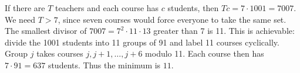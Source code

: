 If there are $ T $ teachers and each course has $ c $ students, then $ Tc=7\cdot1001=7007 $. We need $ T>7 $, since seven courses would force everyone to take the same set. The smallest divisor of $ 7007=7^2\cdot11\cdot13 $ greater than 7 is 11. This is achievable: divide the 1001 students into 11 groups of 91 and label 11 courses cyclically. Group $ j $ takes courses $ j,j+1,\ldots,j+6 $ modulo 11. Each course then has $ 7\cdot91=637 $ students. Thus the minimum is $\boxed{11}$.
